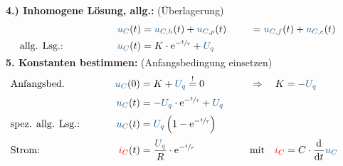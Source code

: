 {\begin{frame}
\textbf{4.) Inhomogene Lösung, allg.:} (Überlagerung)\\[-1em]
\begin{align*}
&&
    \ecv{u_C}(t) &= \ecv{u_{C,h}}(t) + \ecv{u_{C,p}}(t) &
    &= \ecv{u_{C,f}}(t) + \ecv{u_{C,e}}(t)  \\
&\text{allg. Lsg.:}&
    \ecv{u_C}(t) &= K \cdot \mathrm{e}^{-\sfrac{t}{\tau}} + \ecv{U_q}%
\\[-15pt]&\hphantom{R1oooooooooo}&\hphantom{L2oooooooo}&\hphantom{R2oooooooooooooooooo}&&\hphantom{R3oooooooooooooooooo}%
\end{align*}
\pause%
\textbf{5. Konstanten bestimmen:} (Anfangsbedingung einsetzen)\\[-1em]
\begin{align*}
&\text{Anfangsbed.}&
    \ecv{u_C}(0) &= K + \ecv{U_q} \overset{!}{=} 0 &
        &\Rightarrow\quad K = -\ecv{U_q} && \\[2pt]
&&
    \ecv{u_C}(t) &= -\ecv{U_q} \cdot \mathrm{e}^{-\sfrac{t}{\tau}} + \ecv{U_q} \\[2pt]
&\text{spez. allg. Lsg.:}&
    \ecv{u_C}(t) &= \ecv{U_q} \left( 1 - \mathrm{e}^{-\sfrac{t}{\tau}} \right) \\[2pt]
&\text{Strom: }&
    \eci{i_C}(t) &= \frac{\ecv{U_q}}{R} \cdot \mathrm{e}^{-\sfrac{t}{\tau}} &
    &\text{mit}\quad \eci{i_C} = C \cdot \dt \ecv{u_C}
\\[-15pt]&\hphantom{R1oooooooooo}&\hphantom{L2oooooooo}&\hphantom{R2oooooooooooooooooo}&&\hphantom{R3oooooooooooooooooo}%
\end{align*}
\end{frame}
}%


